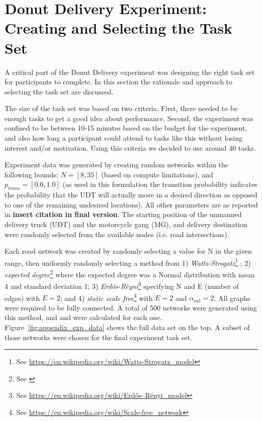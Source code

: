 \section{Donut Delivery Experiment: Creating and Selecting the Task Set} \label{sec:task_set}
A critical part of the Donut Delivery experiment was designing the right task set for participants to complete. In this section the rationale and approach to selecting the task set are discussed.

The size of the task set was based on two criteria. First, there needed to be enough tasks to get a good idea about performance. Second, the experiment was confined to be between 10-15 minutes based on the budget for the experiment, and also how long a participant could attend to tasks like this without losing interest and/or motivation. Using this criteria we decided to use around 40 tasks.

Experiment data was generated by creating random networks within the following bounds: $N = [8,35]$ (based on compute limitations), and $p_{trans}=[0.0,1.0]$ (as used in this formulation the transition probability indicates the probability that the UDT will actually move in a desired direction as opposed to one of the remaining undesired locations). All other parameters are as reported in \textbf{insert citation in final version}. The starting position of the unmanned delivery truck (UDT) and the motorcycle gang (MG), and delivery destination were randomly selected from the available nodes (i.e. road intersections).

Each road network was created by randomly selecting a value for N in the given range, then uniformly randomly selecting a method from 1) \emph{Watts-Strogatz}\footnote{See \url{https://en.wikipedia.org/wiki/Watts-Strogatz_model}} ; 2) \emph{expected degree}\footnote{See \cite{Chung2002-jh}} where the expected degree was a Normal distribution with mean 4 and standard deviation 1; 3) \emph{Erd\"{o}s-R\`{e}yni}\footnote{See \url{https://en.wikipedia.org/wiki/Erdős–Rényi_model}} specifying N and E (number of edges) with $E = 2$; and 4) \emph{static scale free}\footnote{See \url{https://en.wikipedia.org/wiki/Scale-free_network}} with $E = 2$ and $\alpha_{out}=2$. All graphs were required to be fully connected. A total of 500 networks were generated using this method, and \xQ{} and \xO{} were calculated for each one. Figure~\ref{fig:appendix_exp_data} shows the full data set on the top. A subset of those networks were chosen for the final experiment task set.


